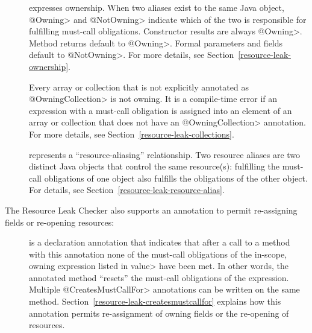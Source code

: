 \begin{description}

\item[]
\item[]
  expresses ownership.  When two aliases exist to the same Java object,
  \<@Owning> and \<@NotOwning> indicate which of the two is responsible for
  fulfilling must-call obligations.
  Constructor results are always \<@Owning>. Method returns default to
  \<@Owning>.  Formal parameters and fields default to \<@NotOwning>.
  For more details, see Section~\ref{resource-leak-ownership}.
\item[]
  Every array or collection that is not explicitly annotated as \<@OwningCollection> is not owning. It is a compile-time error if an expression with a must-call obligation is assigned into an element of an array or collection that does not have an \<@OwningCollection> annotation. For more details, see Section~\ref{resource-leak-collections}.

\item[]
  represents a ``resource-aliasing'' relationship.  Two resource aliases are
  two distinct Java objects that control the same resource(s):
  fulfilling the must-call obligations of one object also
  fulfills the obligations of the other object.  For details,
  see Section~\ref{resource-leak-resource-alias}.

\end{description}

The Resource Leak Checker also supports an annotation to permit re-assigning
fields or re-opening resources:

\begin{description}

\item[]
  is a declaration annotation that indicates that after a call to a method
  with this annotation none of the must-call obligations of the in-scope, owning expression
  listed in \<value> have been met.
  In other words, the annotated method ``resets'' the must-call obligations of the expression.
  Multiple \<@CreatesMustCallFor>
  annotations can be written on the same method.  Section~\ref{resource-leak-createsmustcallfor}
  explains how this annotation permits re-assignment of owning
  fields or the re-opening of resources.

\end{description}


